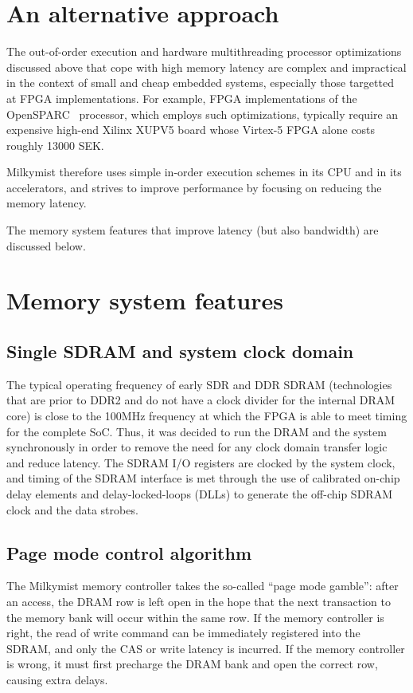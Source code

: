 \documentclass[a4paper,11pt]{kthesis}
\begin{document}
\section{An alternative approach}
The out-of-order execution and hardware multithreading processor optimizations discussed above that cope with high memory latency are complex and impractical in the context of small and cheap embedded systems, especially those targetted at FPGA implementations. For example, FPGA implementations of the OpenSPARC~\cite{opensparc} processor, which employs such optimizations, typically require an expensive high-end Xilinx XUPV5 board whose Virtex-5 FPGA alone costs roughly 13000 SEK.

Milkymist therefore uses simple in-order execution schemes in its CPU and in its accelerators, and strives to improve performance by focusing on reducing the memory latency.

The memory system features that improve latency (but also bandwidth) are discussed below.

\section{Memory system features}
\subsection{Single SDRAM and system clock domain}
The typical operating frequency of early SDR and DDR SDRAM (technologies that are prior to DDR2 and do not have a clock divider for the internal DRAM core) is close to the 100MHz frequency at which the FPGA is able to meet timing for the complete SoC. Thus, it was decided to run the DRAM and the system synchronously in order to remove the need for any clock domain transfer logic and reduce latency. The SDRAM I/O registers are clocked by the system clock, and timing of the SDRAM interface is met through the use of calibrated on-chip delay elements and delay-locked-loops (DLLs) to generate the off-chip SDRAM clock and the data strobes.

\subsection{Page mode control algorithm}
The Milkymist memory controller takes the so-called ``page mode gamble'': after an access, the DRAM row is left open in the hope that the next transaction to the memory bank will occur within the same row. If the memory controller is right, the read of write command can be immediately registered into the SDRAM, and only the CAS or write latency is incurred. If the memory controller is wrong, it must first precharge the DRAM bank and open the correct row, causing extra delays.
\end{document}
